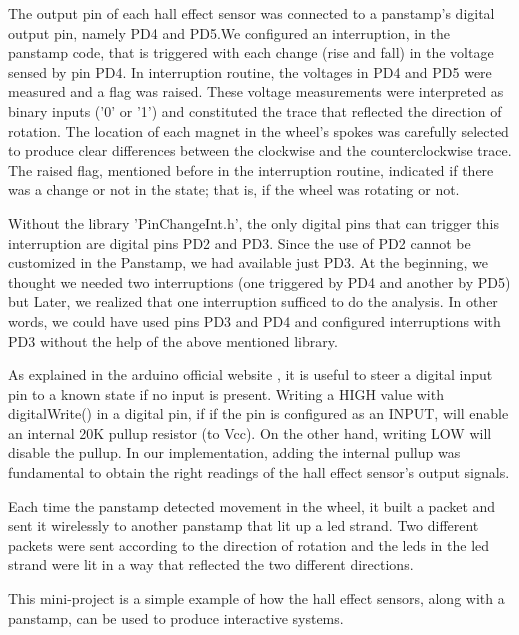 The output pin of each hall effect sensor was connected to a panstamp's digital output pin, namely PD4 and PD5.We configured an interruption, in the panstamp code, that is triggered with each change (rise and fall) in the voltage sensed by pin PD4. In interruption routine, the voltages in PD4 and PD5 were measured and a flag was raised. These voltage measurements were interpreted as binary inputs ('0' or '1') and constituted the trace that reflected the direction of rotation. The location of each magnet in the wheel's spokes was carefully selected to produce clear differences between the clockwise and the counterclockwise trace. The raised flag, mentioned before in the interruption routine, indicated if there was a change or not in the state; that is, if the wheel was rotating or not.

Without the library 'PinChangeInt.h', the only digital pins that can trigger this interruption are digital pins PD2 and PD3. Since the use of PD2 cannot be customized in the Panstamp, we had available just PD3. At the beginning, we thought we needed two interruptions (one triggered by PD4 and another by PD5) but Later, we realized that one interruption sufficed to do the analysis. 
In other words, we could have used pins PD3 and PD4 and configured interruptions with PD3 without the help of the above mentioned library. 

As explained in the arduino official website \cite{arduino}, it is useful to steer a digital input pin to a known state if no input is present. Writing a HIGH value with digitalWrite() in a digital pin, if if the pin is configured as an INPUT, will enable an internal 20K pullup resistor (to Vcc). On the other hand, writing LOW will disable the pullup. In our implementation, adding the internal pullup was fundamental to obtain the right readings of the hall effect sensor's output signals. 

Each time the panstamp detected movement in the wheel, it built a packet and sent it wirelessly to another panstamp that lit up a led strand. Two different packets were sent according to the direction of rotation and the leds in the led strand were lit in a way that reflected the two different directions. 

This mini-project is a simple example of how the hall effect sensors, along with a panstamp, can be used to produce interactive systems. 








